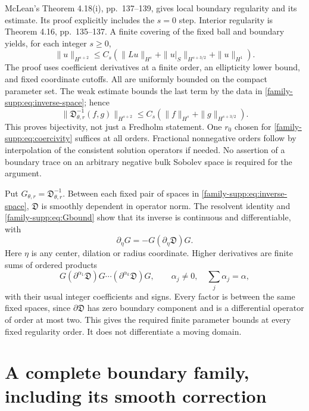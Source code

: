 \documentclass[11pt]{article}
\theoremstyle{definition}
\theoremstyle{remark}
\numberwithin{equation}{section}
\providecommand{\tht}{\theta}
\begin{document}
McLean's Theorem 4.18(i), pp.~137--139, gives local boundary regularity
and its estimate. Its proof explicitly includes the $s=0$ step. Interior
regularity is Theorem 4.16, pp.~135--137. A finite covering of the fixed
ball and boundary yields, for each integer $s\geq0$,
\[
 \|u\|_{H^{s+2}}\leq C_s
 (\|Lu\|_{H^s}+\|u|_S\|_{H^{s+3/2}}+\|u\|_{H^1}).
\]
The proof uses coefficient derivatives at a finite order, an ellipticity
lower bound, and fixed coordinate cutoffs. All are uniformly bounded on
the compact parameter set. The weak estimate bounds the last term by
the data in \eqref{family-supp:eq:inverse-space}; hence
\begin{equation}\label{family-supp:eq:Gbound}
 \|\mathfrak D_{\tht,r}^{-1}(f,g)\|_{H^{s+2}}
 \leq C_s(\|f\|_{H^s}+\|g\|_{H^{s+3/2}}).
\end{equation}
This proves bijectivity, not just a Fredholm statement. One $r_0$ chosen
for \eqref{family-supp:eq:coercivity} suffices at all orders. Fractional nonnegative
orders follow by interpolation of the consistent solution operators if
needed. No assertion of a boundary trace on an arbitrary negative bulk
Sobolev space is required for the argument.

Put $G_{\tht,r}=\mathfrak D_{\tht,r}^{-1}$. Between each fixed pair of
spaces in \eqref{family-supp:eq:inverse-space}, $\mathfrak D$ is smoothly dependent
in operator norm. The resolvent identity and \eqref{family-supp:eq:Gbound} show
that its inverse is continuous and differentiable, with
\begin{equation}\label{family-supp:eq:inverse-derivative}
 \partial_\eta G=-G(\partial_\eta\mathfrak D)G.
\end{equation}
Here $\eta$ is any center, dilation or radius coordinate. Higher
derivatives are finite sums of ordered products
\[
 G(\partial^{\alpha_1}\mathfrak D)G\cdots
       (\partial^{\alpha_k}\mathfrak D)G,
 \qquad \alpha_j\ne0,\quad \sum_j\alpha_j=\alpha,
\]
with their usual integer coefficients and signs. Every factor is between
the same fixed spaces, since $\partial\mathfrak D$ has zero boundary
component and is a differential operator of order at most two.
This gives the required finite parameter bounds at every fixed regularity
order. It does not differentiate a moving domain.

\section{A complete boundary family, including its smooth correction}
\label{family-supp:sec:parametrix}
\end{document}
